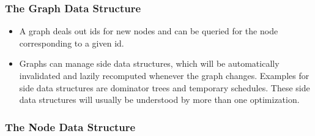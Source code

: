 \documentclass[twocolumn]{svjour3}
\begin{document}
\subsubsection{The Graph Data Structure}
\begin{itemize}
    \item A graph deals out ids for new nodes and can be queried for the node corresponding to a given id.
    \item Graphs can manage side data structures, which will be automatically invalidated and lazily recomputed whenever the graph changes. Examples for side data structures are dominator trees and temporary schedules. These side data structures will usually be understood by more than one optimization.
\end{itemize}

\subsubsection{The Node Data Structure}
\end{document}
